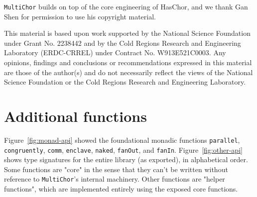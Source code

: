 \documentclass[sigplan,screen,review,anonymous]{acmart}
\newcommand{\HasChor}{Has\-Chor\xspace}
\newcommand{\inlinecode}[2][haskell]{\texttt{#2}}
\newcommand{\MultiChor}{\texttt{Multi\-Chor}\xspace}
\begin{document}
\begin{acks}

\MultiChor builds on top of the core engineering of \HasChor,
and we thank Gan Shen for permission to use his copyright material.

This material is based upon work supported by the National Science Foundation under Grant No. 2238442 and by the Cold Regions Research and Engineering Laboratory (ERDC-CRREL)
under Contract No. W913E521C0003. Any opinions, findings and conclusions or recommendations expressed in this material are those of the author(s) and do not necessarily reflect the views of the National Science Foundation or the Cold Regions Research and Engineering Laboratory.
\end{acks}






\clearpage
\appendix

\section{Additional functions}\label{sec:extra-helpers}
Figure~\ref{fig:monad-api} showed the foundational monadic functions
\inlinecode{parallel}, \inlinecode{congruently},
\inlinecode{comm},
\inlinecode{enclave}, \inlinecode{naked}, \inlinecode{fanOut},
and \inlinecode{fanIn}.
Figure~\ref{fig:other-api} shows type signatures for the entire
library (as exported), in alphabetical order.
Some functions are "core" in the sense that they can't be written
without reference to \MultiChor's internal machinery.
Other functions are "helper functions",
which are implemented entirely using the exposed core functions.
\end{document}
